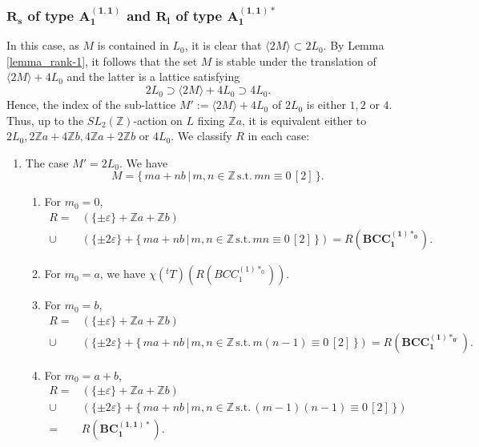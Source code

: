 \documentclass[11pt]{amsart}
\newcommand{\Z}{\mathbb{Z}}
\newcommand{\vep}{\varepsilon}
\begin{document}
\subsubsection{$\mathbf{R_s}$ of type $\mathbf{A_1^{(1,1)}}$ and $\mathbf{R_l}$ of type $\mathbf{A_1^{(1,1)\ast}}$}
In this case, as $M$ is contained in $L_0$, it is clear that $\langle 2M \rangle \subset 2L_0$. By Lemma \ref{lemma_rank-1}, it follows that the set $M$ is stable under the translation of $\langle 2M \rangle +4L_0$ and the latter is a lattice satisfying
\[ 2L_0 \supset \langle 2M \rangle +4L_0 \supset 4L_0. \]
Hence, the index of the sub-lattice $M':=\langle 2M \rangle +4L_0$ of $2L_0$ is either $1,2$ or $4$. Thus, up to the $SL_2(\Z)$-action on $L$ fixing $\Z a$, it is equivalent either to
$2L_0, 2 \Z a+4\Z b, 4 \Z a+2\Z b$ or $4L_0$. We classify $R$ in each case:
\begin{enumerate}
\item The case $M'=2L_0$. We have
\[ M=\{\, ma+nb\, \vert\, m,n \in \Z \, \text{s.t.}\, mn\equiv 0\, [2]\, \}. \]
\begin{enumerate}
\item[(I)] For $m_0=0$, 
\begin{align*}
R=
&(\{ \pm\vep \}+\Z a+\Z b) \\
\cup
&(\{ \pm 2\vep \}+\{\, ma+nb\, \vert\, m,n \in \Z\, \text{s.t.}\, mn \equiv 0\, [2]\, \})
= R(\mathbf{BCC_1^{(1)\ast_0}}).
\end{align*}
\item[(II)] For $m_0=a$, we have $\chi({}^tT)(R(BCC_1^{(1)\ast_0}))$.
\item[(III)] For $m_0=b$, 
\begin{align*}
R=
&(\{ \pm\vep \}+\Z a+\Z b) \\
\cup 
&(\{ \pm 2\vep \}+\{\, ma+nb\, \vert\, m,n \in \Z\, \text{s.t.}\, m(n-1) \equiv 0\, [2]\, \})
= R(\mathbf{BCC_1^{(1)\ast_{0'}}}).
\end{align*}
\item[(IV)] For $m_0=a+b$, 
\begin{align*}
R=
&(\{ \pm\vep \}+\Z a+\Z b) \\
\cup 
&(\{ \pm 2\vep \}+\{\, ma+nb\, \vert\, m,n \in \Z\, \text{s.t.}\, (m-1)(n-1) \equiv 0\, [2]\, \}) \\
= 
&R(\mathbf{BC_1^{(1,1)\ast}}).
\end{align*}
\end{enumerate}

\end{enumerate}
\end{document}
